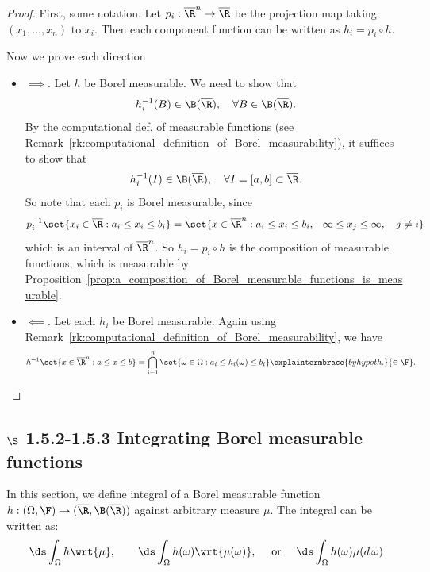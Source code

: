 \documentclass{article} %
\begin{document}
\begin{proof}
First, some notation.  Let $p_i : \overline{\R}^n \to \overline{\R}$ be the projection map taking $(x_1,\hdots, x_n)$ to $x_i$.   Then each component function can be written as $h_i = p_i \circ h$.

Now we prove each direction
\begin{itemize}
\item $\boxed{\implies}$.  Let $h$ be Borel measurable. We need to show that
\[ h_i^{-1}(B) \in \B(\overline{\R}), \quad \forall B \in \B(\overline{\R}). \]
By the computational def. of measurable functions (see Remark~\ref{rk:computational_definition_of_Borel_measurability}), it suffices to show that 
\[ h_i^{-1}(I) \in \B(\overline{\R}), \quad \forall I = [a,b] \subset \overline{\R}.\]
So note that each $p_i$ is Borel measurable, since 
 \[ p_i^{-1} \set{x_i \in \overline{\R} : a_i \leq x_i \leq b_i} = \set{x \in \overline{\R}^n : a_i \leq x_i \leq b_i,  -\infty \leq x_j \leq \infty, \quad j \neq i }\]
 which is an interval of $\overline{\R}^n$.  So $h_i = p_i \circ h$ is the composition of measurable functions, which is measurable by Proposition~\ref{prop:a_composition_of_Borel_measurable_functions_is_measurable}.

\item $\boxed{\impliedby}$. Let each $h_i$ be Borel measurable.   Again using Remark~\ref{rk:computational_definition_of_Borel_measurability}, we have
\begin{align*}
h^{-1} \set{x \in \overline{\R}^n : a \leq x \leq b} &= \bigcap_{i=1}^n \set{\omega \in \Omega : a_i \leq h_i(\omega) \leq b_i} \explaintermbrace{by hypoth.}{\in \F}.
\end{align*}
  
\end{itemize}
 	
\end{proof}


\subsection{$\S$ 1.5.2-1.5.3 Integrating  Borel measurable functions}

In this section, we define integral of a Borel measurable function $h : (\Omega, \F) \to (\overline{\R}, \B(\overline{\R}))$ against arbitrary measure $\mu$.  The integral can be written as:
\[ \ds\int_{\Omega} h \wrt{\mu}, \quad \quad \ds\int_{\Omega} h(\omega) \wrt{\mu(\omega)}, \quad \text{ or } \quad \ds\int_{\Omega} h(\omega) \mu(d \, \omega) \]
 
\end{document}
